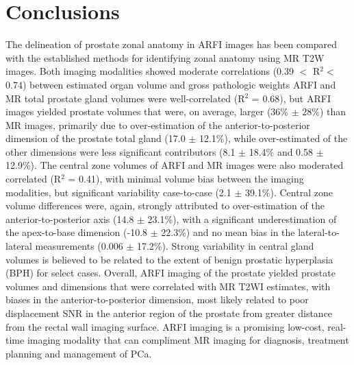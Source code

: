 \section{Conclusions}
The delineation of prostate zonal anatomy in ARFI images has been compared with
the established methods for identifying zonal anatomy using MR T2W images.
Both imaging modalities showed moderate correlations (0.39 $<$ R$^2 < $ 0.74)
between estimated organ volume and gross pathologic weights ARFI and MR total
prostate gland volumes were well-correlated (R$^2$ = 0.68), but ARFI images
yielded prostate volumes that were, on average, larger (36\% $\pm$ 28\%) than
MR images, primarily due to over-estimation of the anterior-to-posterior
dimension of the prostate total gland (17.0 $\pm$ 12.1\%), while over-estimated
of the other dimensions were less significant contributors (8.1 $\pm$ 18.4\%
and 0.58 $\pm$ 12.9\%).  The central zone volumes of ARFI and MR images were
also moderated correlated (R$^2$ = 0.41), with minimal volume bias between the
imaging modalities, but significant variability case-to-case (2.1 $\pm$
39.1\%).  Central zone volume differences were, again, strongly attributed to
over-estimation of the anterior-to-posterior axis (14.8 $\pm$ 23.1\%), with a
significant underestimation of the apex-to-base dimension (-10.8 $\pm$ 22.3\%)
and no mean bias in the lateral-to-lateral measurements (0.006 $\pm$ 17.2\%).
Strong variability in central gland volumes is believed to be related to the
extent of benign prostatic hyperplasia (BPH) for select cases.  Overall, ARFI
imaging of the prostate yielded prostate volumes and dimensions that were
correlated with MR T2WI estimates, with biases in the anterior-to-posterior
dimension, most likely related to poor displacement SNR in the anterior region
of the prostate from greater distance from the rectal wall imaging surface.
ARFI imaging is a promising low-cost, real-time imaging modality that can
compliment MR imaging for diagnosis, treatment planning and management of PCa.
